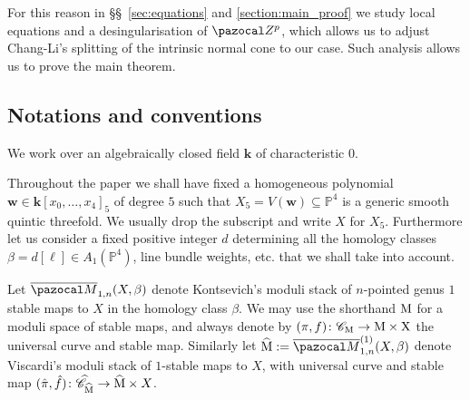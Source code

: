\documentclass[11pt]{amsart}
\newcommand{\M}[4]{\overline{\pazocal M}_{#1,#2}(#3,#4)}
\newcommand{\PP}{\mathbb P}
\renewcommand{\k}{\mathbf k}
\renewcommand{\to}{\rightarrow}
\newcommand{\cC}{\mathcal C}
\newcommand{\hC}{\widehat{\mathcal C}}
\newcommand{\Zp}{\pazocal Z^p}
\newcommand{\hrM}{\widehat{\rm{M}}}
\newcommand{\oM}{\overline{\pazocal M}}
\theoremstyle{plain}
\theoremstyle{definition}
\begin{document}
For this reason in \S\S~\ref{sec:equations} and \ref{section:main_proof} we study local equations and a desingularisation of $\Zp$, which allows us to adjust Chang-Li's splitting of the intrinsic normal cone to our case. Such analysis allows us to prove the main theorem.

\subsection{Notations and conventions} We work over an algebraically closed field $\k$ of characteristic $0$.

Throughout the paper we shall have fixed a homogeneous polynomial $\mathbf w\in\k[x_0,\ldots,x_4]_5$ of degree $5$ such that $X_5=V(\mathbf w)\subseteq\PP^4$ is a generic smooth quintic threefold. We usually drop the subscript and write $X$ for $X_5$. Furthermore let us consider a fixed positive integer $d$ determining all the homology classes $\beta=d[\ell]\in A_1(\PP^4)$, line bundle weights, etc. that we shall take into account.

Let $\M{1}{n}{X}{\beta}$ denote Kontsevich's moduli stack of $n$-pointed genus $1$ stable maps to $X$ in the homology class $\beta$. We may use the shorthand $\rm M$ for a moduli space of stable maps, and always denote by $(\pi,f)\colon\cC_{\rm M}\to \rm M\times X$ the universal curve and stable map. Similarly let $\hrM:=\oM_{1,n}^{(1)}(X,\beta)$ denote Viscardi's moduli stack of $1$-stable maps to $X$, with universal curve and stable map $(\hat\pi,\hat f)\colon\hC_{\hrM}\to \hrM\times X$.
\end{document}
